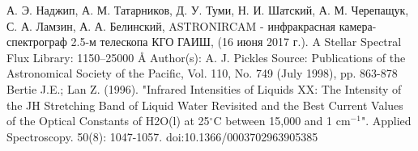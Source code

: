 \documentclass[a4paper]{article}
\begin{document}
\begin{figure}[h]
\end{figure}
\begin{figure}[h]
\end{figure}

\hfill\break
\newpage
\begin{thebibliography}{3}
А. Э. Наджип, А. М. Татарников, Д. У. Туми, Н. И. Шатский, А. М. Черепащук, С. А. Ламзин, А. А. Белинский,  ASTRONIRCAM - инфракрасная камера-спектрограф 2.5-м телескопа КГО ГАИШ, (16 июня 2017 г.).
A Stellar Spectral Flux Library: 1150–25000 Å
Author(s): A. J.  Pickles
Source: 
Publications of the Astronomical Society of the Pacific, 
Vol. 110, No. 749 (July 1998),
pp. 863-878
Bertie J.E.; Lan Z. (1996). "Infrared Intensities of Liquids XX: The Intensity of the JH Stretching Band of Liquid Water Revisited and the Best Current Values of the Optical Constants of H2O(l) at 25$^\circ$C between 15,000 and 1 cm$^{-1}$". Applied Spectroscopy. 50(8): 1047-1057.
doi:10.1366/0003702963905385
\end{thebibliography}
\end{document}

